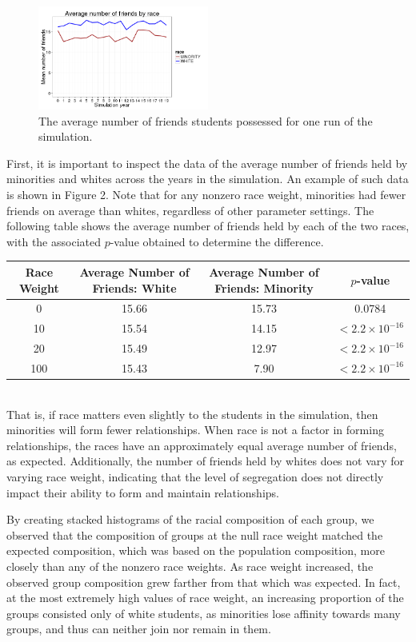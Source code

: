 \begin{figure}[h]
  \centering
    \includegraphics[width=0.5\textwidth]{avgNumberOfFriendsFromCaladan.png}
      \caption{The average number of friends students possessed for one run of the simulation.}
\end{figure}
First, it is important to inspect the data of the average number of friends held by minorities and whites across the years 
in the simulation. An example of such data is shown in Figure 2. Note that for any nonzero race weight, 
minorities had fewer friends on average than whites, regardless of other parameter settings. The following table shows the average 
number of friends held by each of the two races, with the associated $p$-value obtained to determine the difference.
\begin{center}
\begin{tabular}{|c|c|c|c|}
\hline
Race Weight & Average Number of Friends: White & Average Number of Friends: Minority & $p$-value\\
\hline
0 & 15.66 & 15.73 & 0.0784\\
10 & 15.54 & 14.15 & $<2.2\times 10^{-16}$\\
20 & 15.49 & 12.97 & $<2.2\times 10^{-16}$\\
100 & 15.43 & 7.90 & $<2.2\times 10^{-16}$\\
\hline
\end{tabular}
\end{center}~~\\

That is, if race matters even slightly to the students in the simulation, then minorities will form fewer relationships. When race is not a factor in 
forming relationships, the races have an approximately equal average number of friends, as expected. Additionally, the number of friends held by whites 
does not vary for varying race weight, indicating that the level of segregation does not directly impact their ability to form and maintain relationships.

By creating stacked histograms of the racial composition of each group, we observed that the composition of groups at the null 
race weight matched the expected composition, which was based on the population composition, more closely than any of the 
nonzero race weights. As race weight increased, the observed group composition grew farther from that which was expected. In 
fact, at the most extremely high values of race weight, an increasing proportion of the groups consisted only of white 
students, as minorities lose affinity towards many groups, and thus can neither join nor remain in them.

